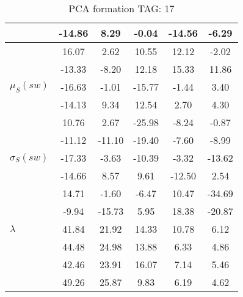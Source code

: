 \begin{table}[h!]
\begin{center}
\begin{tabular}{| l | c | c | c | c | c |}
 & -14.86  & 8.29  & -0.04  & -14.56  & -6.29 \\\hline
 & 16.07  & 2.62  & 10.55  & 12.12  & -2.02 \\\hline
 & -13.33  & -8.20  & 12.18  & 15.33  & 11.86 \\\hline
$\mu_S(sw)$ & -16.63  & -1.01  & -15.77  & -1.44  & 3.40 \\\hline
 & -14.13  & 9.34  & 12.54  & 2.70  & 4.30 \\\hline
 & 10.76  & 2.67  & -25.98  & -8.24  & -0.87 \\\hline
 & -11.12  & -11.10  & -19.40  & -7.60  & -8.99 \\\hline
$\sigma_S(sw)$ & -17.33  & -3.63  & -10.39  & -3.32  & -13.62 \\\hline
 & -14.66  & 8.57  & 9.61  & -12.50  & 2.54 \\\hline
 & 14.71  & -1.60  & -6.47  & 10.47  & -34.69 \\\hline
 & -9.94  & -15.73  & 5.95  & 18.38  & -20.87 \\\hline
$\lambda$ & 41.84  & 21.92  & 14.33  & 10.78  & 6.12 \\\hline
 & 44.48  & 24.98  & 13.88  & 6.33  & 4.86 \\\hline
 & 42.46  & 23.91  & 16.07  & 7.14  & 5.46 \\\hline
 & 49.26  & 25.87  & 9.83  & 6.19  & 4.62 \\\hline
\end{tabular}
\caption{PCA formation TAG: 17}
\end{center}
\end{table}